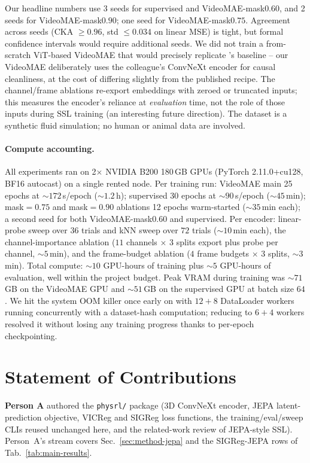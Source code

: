 \documentclass{article}
\begin{document}
Our headline numbers use 3 seeds for supervised and VideoMAE-mask$0.60$, and
2 seeds for VideoMAE-mask$0.90$; one seed for VideoMAE-mask$0.75$. Agreement
across seeds (CKA $\geq 0.96$, std $\leq 0.034$ on linear MSE) is tight, but
formal confidence intervals would require additional seeds. We did not train
a from-scratch ViT-based VideoMAE that would precisely replicate
\citet{qu2026spatiotemporal}'s baseline -- our VideoMAE deliberately uses the
colleague's ConvNeXt encoder for causal cleanliness, at the cost of differing
slightly from the published recipe. The channel/frame ablations re-export
embeddings with zeroed or truncated inputs; this measures the encoder's
reliance at \emph{evaluation} time, not the role of those inputs during SSL
training (an interesting future direction). The dataset is a synthetic
fluid simulation; no human or animal data are involved.

\paragraph{Compute accounting.} All experiments ran on 2$\times$ NVIDIA B200
180\,GB GPUs (PyTorch 2.11.0+cu128, BF16 autocast) on a single rented node.
Per training run: VideoMAE main 25 epochs at ${\sim}172$\,s/epoch
(${\sim}1.2$\,h); supervised 30 epochs at ${\sim}90$\,s/epoch (${\sim}45$\,min);
mask$=0.75$ and mask$=0.90$ ablations 12 epochs warm-started
(${\sim}35$\,min each); a second seed for both VideoMAE-mask$0.60$ and
supervised. Per encoder: linear-probe sweep over $36$ trials and kNN sweep
over $72$ trials (${\sim}10$\,min each), the channel-importance ablation
($11$ channels $\times$ $3$ splits export plus probe per channel,
${\sim}5$\,min), and the frame-budget ablation ($4$ frame budgets $\times$ 3
splits, ${\sim}3$\,min). Total compute: ${\sim}10$ GPU-hours of training plus
${\sim}5$ GPU-hours of evaluation, well within the project budget. Peak VRAM
during training was ${\sim}71$\,GB on the VideoMAE GPU and ${\sim}51$\,GB on
the supervised GPU at batch size $64$. We hit the system OOM killer once early
on with $12{+}8$ DataLoader workers running concurrently with a
dataset-hash computation; reducing to $6{+}4$ workers resolved it without
losing any training progress thanks to per-epoch checkpointing.

\section*{Statement of Contributions}

\textbf{Person A} authored the \texttt{physrl/} package (3D ConvNeXt encoder,
JEPA latent-prediction objective, VICReg and SIGReg loss functions, the
training/eval/sweep CLIs reused unchanged here, and the related-work review of
JEPA-style SSL). Person~A's stream covers Sec.~\ref{sec:method-jepa} and the
SIGReg-JEPA rows of Tab.~\ref{tab:main-results}.
\end{document}
